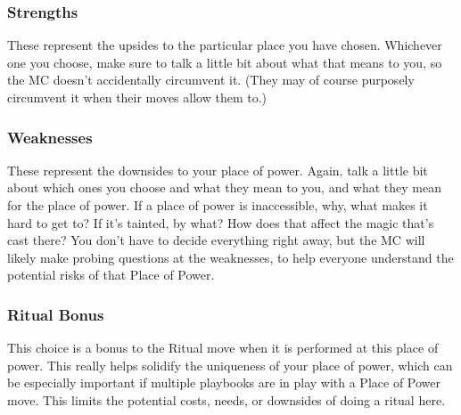 \documentclass[
  oneside,
  statementpaper,
  9pt]{memoir}
\begin{document}
\hypertarget{strengths}{%
\subsubsection{Strengths}\label{strengths}}

\begin{Player}

These represent the upsides to the particular place you have chosen. Whichever one you choose, make sure to talk a little bit about what that means to you, so the MC doesn’t accidentally circumvent it. (They may of course purposely circumvent it when their moves allow them to.)

\end{Player}

\hypertarget{weaknesses}{%
\subsubsection{Weaknesses}\label{weaknesses}}

\begin{Player}

These represent the downsides to your place of power. Again, talk a little bit about which ones you choose and what they mean to you, and what they mean for the place of power. If a place of power is inaccessible, why, what makes it hard to get to? If it’s tainted, by what? How does that affect the magic that’s cast there? You don’t have to decide everything right away, but the MC will likely make probing questions at the weaknesses, to help everyone understand the potential risks of that Place of Power.

\end{Player}

\hypertarget{ritual-bonus}{%
\subsubsection{Ritual Bonus}\label{ritual-bonus}}

\begin{Player}

This choice is a bonus to the Ritual move when it is performed at this place of power. This really helps solidify the uniqueness of your place of power, which can be especially important if multiple playbooks are in play with a Place of Power move. This limits the potential costs, needs, or downsides of doing a ritual here.

\end{Player}
\end{document}
